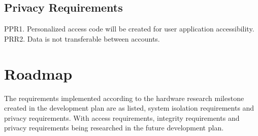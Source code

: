 \documentclass[12pt, titlepage]{article}
\begin{document}
\subsection{Privacy Requirements}

PPR1. Personalized access code will be created for user application accessibility. 
\\PRR2. Data is not transferable between accounts.


\section{Roadmap}

The requirements implemented according to the hardware research milestone created in the development plan are as listed, system isolation requirements and privacy requirements. With access requirements, integrity requirements and privacy requirements being researched in the future development plan.
\end{document}
